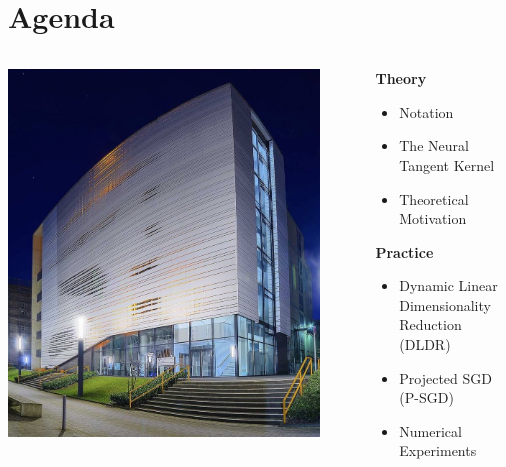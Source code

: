 \documentclass[t]{beamer}
\begin{document}
\section{Agenda}
\begin{frame}
\begin{columns}[c]

\begin{column}{0.5\textwidth}
\begin{center}
\includegraphics[width=0.9\textwidth]{toaster}
\end{center}
\end{column}

\begin{column}{0.5\textwidth}
\textbf{Theory}\vspace{0.2cm}
\begin{itemize}
\item Notation \vspace{0.2cm}
\item The Neural Tangent Kernel \vspace{0.2cm}
\item Theoretical Motivation
\end{itemize} \vspace{0.5cm}
\textbf{Practice}\vspace{0.2cm}
\begin{itemize}
\item Dynamic Linear Dimensionality Reduction (DLDR)  \vspace{0.2cm}
\item Projected SGD (P-SGD) \vspace{0.2cm}
\item Numerical Experiments  \vspace{0.2cm}
\end{itemize}
\end{column}

\end{columns}
\end{frame}
\end{document}
